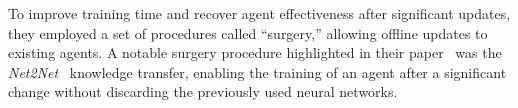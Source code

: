 To improve training time and recover agent effectiveness after 
significant updates, they employed a set of procedures called 
``surgery,'' allowing offline updates to existing agents. 
A notable surgery procedure highlighted in their paper~\cite{berner2019} 
was the \emph{Net2Net}~\cite{chen2016} knowledge transfer, 
enabling the training of an agent after a significant change 
without discarding the previously used neural networks.










